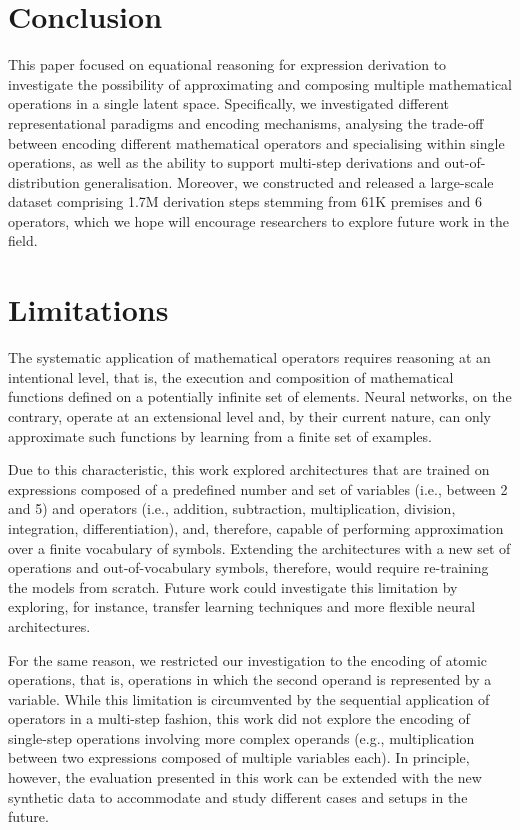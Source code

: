 \documentclass[11pt]{article}
\begin{document}
\section{Conclusion}
This paper focused on equational reasoning for expression derivation to investigate the possibility of approximating and composing multiple mathematical operations in a single latent space. Specifically, we investigated different representational paradigms and encoding mechanisms, analysing the trade-off between encoding different mathematical operators and specialising within single operations, as well as the ability to support multi-step derivations and out-of-distribution generalisation.
Moreover, we constructed and released a large-scale dataset comprising 1.7M derivation steps stemming from 61K premises and 6 operators, which we hope will encourage researchers to explore future work in the field.

\section{Limitations}

The systematic application of mathematical operators requires reasoning at an intentional level, that is, the execution and composition of mathematical functions defined on a potentially infinite set of elements. Neural networks, on the contrary, operate at an extensional level and, by their current nature, can only approximate such functions by learning from a finite set of examples. 

Due to this characteristic, this work explored architectures that are trained on expressions composed of a predefined number and set of variables (i.e., between 2 and 5) and operators (i.e., addition, subtraction, multiplication, division, integration, differentiation), and, therefore, capable of performing approximation over a finite vocabulary of symbols. 
Extending the architectures with a new set of operations and out-of-vocabulary symbols, therefore, would require re-training the models from scratch. Future work could investigate this limitation by exploring, for instance, transfer learning techniques and more flexible neural architectures. 

For the same reason, we restricted our investigation to the encoding of atomic operations, that is, operations in which the second operand is represented by a variable. While this limitation is circumvented by the sequential application of operators in a multi-step fashion, this work did not explore the encoding of single-step operations involving more complex operands (e.g., multiplication between two expressions composed of multiple variables each). In principle, however, the evaluation presented in this work can be extended with the new synthetic data to accommodate and study different cases and setups in the future.  
\end{document}
